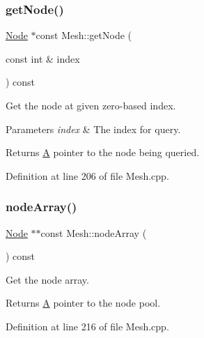\mbox{\label{class_mesh_a071a8dfe15c00fcabc9c4071306487d4}} 
\subsubsection{\texorpdfstring{get\+Node()}{getNode()}}
{\footnotesize\ttfamily \mbox{\hyperlink{class_node}{Node}} $\ast$const Mesh\+::get\+Node (\begin{DoxyParamCaption}\item[{const int \&}]{index }\end{DoxyParamCaption}) const}



Get the node at given zero-\/based index. 


\begin{DoxyParams}{Parameters}
{\em index} & The index for query. \\
\hline
\end{DoxyParams}
\begin{DoxyReturn}{Returns}
\mbox{\hyperlink{class_a}{A}} pointer to the node being queried. 
\end{DoxyReturn}


Definition at line 206 of file Mesh.\+cpp.

\mbox{\label{class_mesh_ae596a597115563fb308d99e5e15a62e6}} 
\subsubsection{\texorpdfstring{node\+Array()}{nodeArray()}}
{\footnotesize\ttfamily \mbox{\hyperlink{class_node}{Node}} $\ast$$\ast$const Mesh\+::node\+Array (\begin{DoxyParamCaption}{ }\end{DoxyParamCaption}) const}



Get the node array. 

\begin{DoxyReturn}{Returns}
\mbox{\hyperlink{class_a}{A}} pointer to the node pool. 
\end{DoxyReturn}


Definition at line 216 of file Mesh.\+cpp.

\mbox{\label{class_mesh_a6a535f67f00ed39f945aaa1e8039a277}} 
